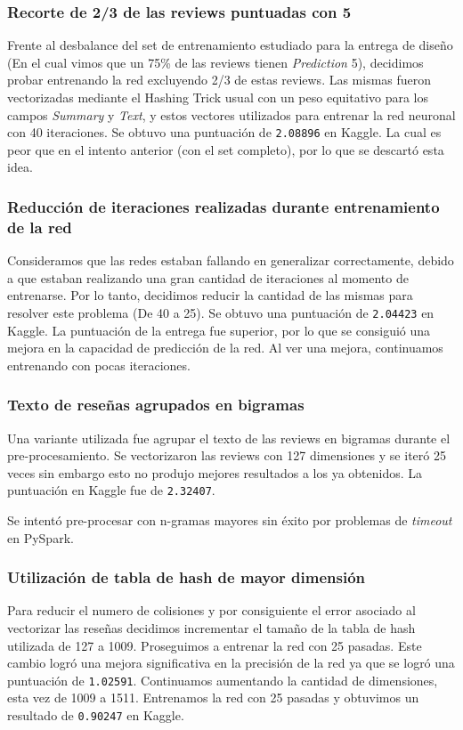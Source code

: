 \documentclass[10pt,a4paper]{article}
\begin{document}
\subsubsection{Recorte de 2/3 de las reviews puntuadas con 5}
Frente al desbalance del set de entrenamiento estudiado para la entrega de diseño (En el cual vimos que un 75\% de las reviews tienen \textit{Prediction} 5), decidimos probar entrenando la red excluyendo 2/3 de estas reviews.
Las mismas fueron vectorizadas mediante el Hashing Trick usual con un peso equitativo para los campos \textit{Summary} y \textit{Text}, y estos vectores utilizados para entrenar la red neuronal con 40 iteraciones.
Se obtuvo una puntuación de \texttt{2.08896} en Kaggle. La cual es peor que en el intento anterior (con el set completo), por lo que se descartó esta idea.

\subsubsection{Reducción de iteraciones realizadas durante entrenamiento de la red}
Consideramos que las redes estaban fallando en generalizar correctamente, debido a que estaban realizando una gran cantidad de iteraciones al momento de entrenarse. Por lo tanto, decidimos reducir la cantidad de las mismas para resolver este problema (De 40 a 25). 
Se obtuvo una puntuación de \texttt{2.04423} en Kaggle. La puntuación de la entrega fue superior, por lo que se consiguió una mejora en la capacidad de predicción de la red. Al ver una mejora, continuamos entrenando con pocas iteraciones.

\subsubsection{Texto de reseñas agrupados en bigramas}
Una variante utilizada fue agrupar el texto de las reviews en bigramas durante el pre-procesamiento. Se vectorizaron las reviews con 127 dimensiones y se iteró 25 veces sin embargo esto no produjo mejores resultados a los ya obtenidos. La puntuación en Kaggle fue de \texttt{2.32407}.

Se intentó pre-procesar con n-gramas mayores sin éxito por problemas de \textit{timeout} en PySpark.

\subsubsection{Utilización de tabla de hash de mayor dimensión}
Para reducir el numero de colisiones y por consiguiente el error asociado al vectorizar las reseñas decidimos incrementar el tamaño de la tabla de hash utilizada de 127 a 1009. Proseguimos a entrenar la red con 25 pasadas. Este cambio logró una mejora significativa en la precisión de la red ya que se logró una puntuación de \texttt{1.02591}. Continuamos aumentando la cantidad de dimensiones, esta vez de 1009 a 1511. Entrenamos la red con 25 pasadas y obtuvimos un resultado de \texttt{0.90247} en Kaggle.
\end{document}
